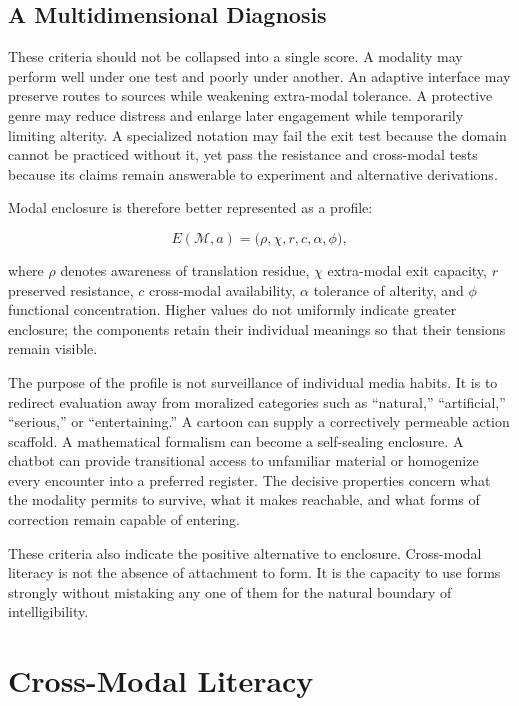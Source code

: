 \documentclass[11pt]{article}
\newcommand{\modality}{\mathcal{M}}
\begin{document}
\subsection{A Multidimensional Diagnosis}

These criteria should not be collapsed into a single score. A modality may
perform well under one test and poorly under another. An adaptive interface
may preserve routes to sources while weakening extra-modal tolerance. A
protective genre may reduce distress and enlarge later engagement while
temporarily limiting alterity. A specialized notation may fail the exit test
because the domain cannot be practiced without it, yet pass the resistance and
cross-modal tests because its claims remain answerable to experiment and
alternative derivations.

Modal enclosure is therefore better represented as a profile:

\begin{equation}
  E(\modality,a)
  =
  \bigl(
    \rho,
    \chi,
    r,
    c,
    \alpha,
    \phi
  \bigr),
  \label{eq:enclosure-profile}
\end{equation}

where \(\rho\) denotes awareness of translation residue, \(\chi\) extra-modal
exit capacity, \(r\) preserved resistance, \(c\) cross-modal availability,
\(\alpha\) tolerance of alterity, and \(\phi\) functional concentration.
Higher values do not uniformly indicate greater enclosure; the components
retain their individual meanings so that their tensions remain visible.

The purpose of the profile is not surveillance of individual media habits.
It is to redirect evaluation away from moralized categories such as
``natural,'' ``artificial,'' ``serious,'' or ``entertaining.'' A cartoon can
supply a correctively permeable action scaffold. A mathematical formalism can
become a self-sealing enclosure. A chatbot can provide transitional access to
unfamiliar material or homogenize every encounter into a preferred register.
The decisive properties concern what the modality permits to survive, what it
makes reachable, and what forms of correction remain capable of entering.

These criteria also indicate the positive alternative to enclosure.
Cross-modal literacy is not the absence of attachment to form. It is the
capacity to use forms strongly without mistaking any one of them for the
natural boundary of intelligibility.

\section{Cross-Modal Literacy}
\end{document}
